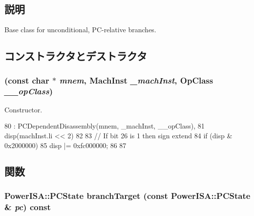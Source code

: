 \subsection{説明}
Base class for unconditional, PC-\/relative branches. 

\subsection{コンストラクタとデストラクタ}
\hypertarget{classPowerISA_1_1BranchPCRel_ada70cbd51e3d10b3d1bd1bd6ab517e08}{
\subsubsection[{BranchPCRel}]{ (const char $\ast$ {\em mnem}, \/  {\bf MachInst} {\em \_\-machInst}, \/  OpClass {\em \_\-\_\-opClass})}}
\label{classPowerISA_1_1BranchPCRel_ada70cbd51e3d10b3d1bd1bd6ab517e08}


Constructor. 


\begin{DoxyCode}
80         : PCDependentDisassembly(mnem, _machInst, __opClass),
81           disp(machInst.li << 2)
82     {
83         // If bit 26 is 1 then sign extend
84         if (disp & 0x2000000) {
85             disp |= 0xfc000000;
86         }
87     }
\end{DoxyCode}


\subsection{関数}
\hypertarget{classPowerISA_1_1BranchPCRel_a860401b0a6432ac5dbe246c64448d56d}{
\subsubsection[{branchTarget}]{\setlength{\rightskip}{0pt plus 5cm}PowerISA::PCState branchTarget (const PowerISA::PCState \& {\em pc}) const}}
\label{classPowerISA_1_1BranchPCRel_a860401b0a6432ac5dbe246c64448d56d}



